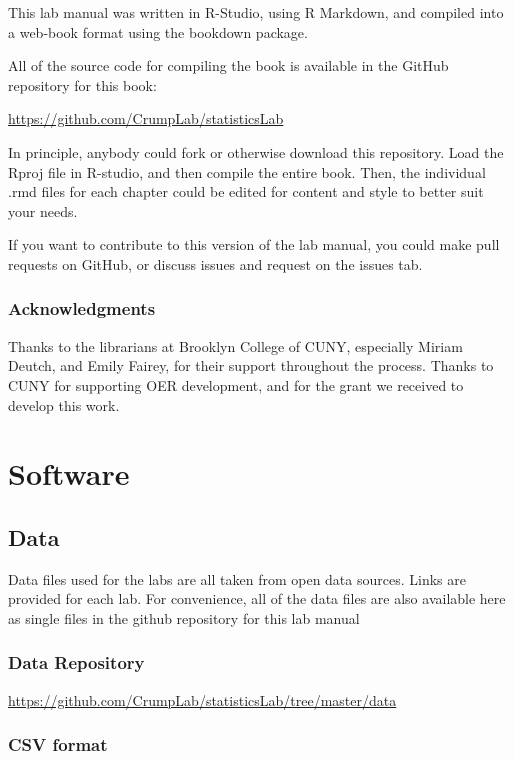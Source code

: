 \documentclass[]{book}
\begin{document}
This lab manual was written in R-Studio, using R Markdown, and compiled
into a web-book format using the bookdown package.

All of the source code for compiling the book is available in the GitHub
repository for this book:

\url{https://github.com/CrumpLab/statisticsLab}

In principle, anybody could fork or otherwise download this repository.
Load the Rproj file in R-studio, and then compile the entire book. Then,
the individual .rmd files for each chapter could be edited for content
and style to better suit your needs.

If you want to contribute to this version of the lab manual, you could
make pull requests on GitHub, or discuss issues and request on the
issues tab.

\subsection{Acknowledgments}\label{acknowledgments}

Thanks to the librarians at Brooklyn College of CUNY, especially Miriam
Deutch, and Emily Fairey, for their support throughout the process.
Thanks to CUNY for supporting OER development, and for the grant we
received to develop this work.

\chapter*{Software}\label{software}

\section{Data}\label{data}

Data files used for the labs are all taken from open data sources. Links
are provided for each lab. For convenience, all of the data files are
also available here as single files in the github repository for this
lab manual

\subsection{Data Repository}\label{data-repository}

\url{https://github.com/CrumpLab/statisticsLab/tree/master/data}

\subsection{CSV format}\label{csv-format}
\end{document}
